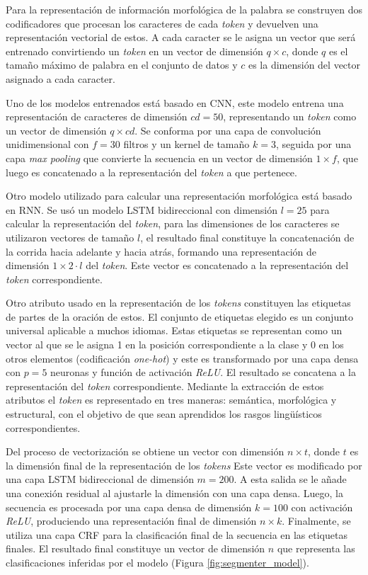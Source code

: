 \documentclass[a4paper,11pt,twocolumn,twoside]{article}
\begin{document}
Para la representación de información morfológica de la palabra se construyen dos
codificadores que procesan los caracteres de cada \textit{token} y devuelven una representación vectorial de estos.
A cada caracter se le asigna un vector que será entrenado convirtiendo un \textit{token} en un vector de dimensión
$q \times c$, donde $q$ es el tamaño máximo de palabra en el conjunto de datos y $c$ es la dimensión del vector
asignado a cada caracter.

Uno de los modelos entrenados está basado en CNN, este modelo entrena una representación de caracteres de dimensión
$cd=50$, representando un \textit{token} como un vector de dimensión $q \times cd$. Se conforma por una capa de convolución unidimensional
con $f=30$ filtros y un kernel de tamaño $k=3$, seguida por una capa \textit{max pooling} que convierte la secuencia en un vector
de dimensión $1 \times f$, que luego es concatenado a la representación del \textit{token} a que pertenece.

Otro modelo utilizado para calcular una representación morfológica está basado en RNN. Se usó
un modelo LSTM bidireccional con dimensión $l=25$ para calcular la representación del \textit{token}, para las dimensiones de los caracteres se
utilizaron vectores de tamaño $l$, el resultado final constituye la concatenación de la corrida hacia adelante y
hacia atrás, formando una representación de dimensión $1 \times 2 \cdot l$ del \textit{token}. Este vector es concatenado a la representación
del \textit{token} correspondiente. 

Otro atributo usado en la representación de los \textit{tokens} constituyen las etiquetas de 
partes de la oración de estos.
El conjunto de etiquetas elegido es un conjunto universal \cite{petrov2011universal} aplicable a muchos idiomas.
Estas etiquetas se representan como un vector al que se le asigna 1 en la posición correspondiente a la clase y 0 en 
los otros elementos (codificación \textit{one-hot}) y este es transformado por una capa densa con $p=5$ neuronas
y función de activación \textit{ReLU}. El resultado se concatena a la representación del \textit{token} correspondiente. Mediante 
la extracción de estos atributos el \textit{token} es representado en tres maneras: semántica, morfológica y estructural, con el 
objetivo de que sean aprendidos los rasgos lingüísticos correspondientes.

Del proceso de vectorización se obtiene un vector con dimensión $n \times t$, donde $t$ es la dimensión final de la representación
de los \textit{tokens}  Este vector es modificado por una capa LSTM bidireccional de dimensión $m=200$. A esta salida se le 
añade una conexión residual al ajustarle la dimensión con una capa densa. Luego, la secuencia es procesada por una 
capa densa de dimensión $k=100$ con activación \textit{ReLU}, produciendo una representación final de dimensión 
$n \times k$. Finalmente, se utiliza una capa CRF
para la clasificación final de la secuencia en las etiquetas finales. El resultado final constituye un vector
de dimensión $n$ que representa las clasificaciones inferidas por el modelo (Figura \ref{fig:segmenter_model}).
\end{document}
